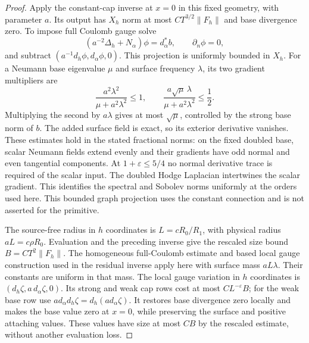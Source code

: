 \documentclass[11pt]{amsart}
\theoremstyle{definition}
\theoremstyle{remark}
\theoremstyle{plain}
\begin{document}
\begin{proof}
Apply the constant-cap inverse at $x=0$ in this
fixed geometry, with parameter $a$. Its output
has $X_h$ norm at most $CT^{3/2}\|F_h\|$ and
base divergence zero. To impose full Coulomb gauge
solve
\[
       (a^{-2}\Delta_h+N_\alpha)\phi=d_\alpha^*b,
                         \qquad \partial_n\phi=0,
\]
and subtract $(a^{-1}d_h\phi,d_\alpha\phi,0)$.
This projection is uniformly bounded in $X_h$.
For a Neumann base eigenvalue $\mu$ and surface
frequency $\lambda$, its two gradient multipliers are
\begin{equation}\label{eq:excision-constant-coulomb-multipliers}
 \frac{a^2\lambda^2}{\mu+a^2\lambda^2}\leq1,\qquad
 \frac{a\sqrt\mu\,\lambda}{\mu+a^2\lambda^2}\leq\frac12 .
\end{equation}
Multiplying the second by $a\lambda$ gives at most
$\sqrt\mu$, controlled by the strong base norm of
$b$. The added surface field is exact, so its
exterior derivative vanishes.
These estimates hold in the stated fractional norms:
on the fixed doubled base, scalar Neumann fields
extend evenly and their gradients have odd normal
and even tangential components. At
$1+\varepsilon\leq5/4$ no normal derivative trace
is required of the scalar input. The doubled
Hodge Laplacian intertwines the scalar gradient.
This identifies the spectral and Sobolev norms
uniformly at the orders used here.
This bounded graph projection uses the constant
connection and is not asserted for the primitive.

The source-free radius in $h$ coordinates is
$L=cR_0/R_1$, with physical radius $aL=c\rho R_0$.
Evaluation and the preceding inverse give the
rescaled size bound $B=CT^2\|F_h\|$.
The homogeneous full-Coulomb estimate and based
local gauge construction used in the residual
inverse apply here with surface mass $aL\lambda$.
Their constants are uniform in that mass.
The local gauge variation in $h$ coordinates is
$(d_h\zeta,a\,d_\alpha\zeta,0)$.
Its strong and weak cap rows cost at most
$CL^{-\varepsilon}B$; for the weak base row use
$a d_\alpha d_h\zeta=d_h(a d_\alpha\zeta)$.
It restores base divergence zero locally and makes
the base value zero at $x=0$, while preserving
the surface and positive attaching values.
These values have size at most $CB$ by the
rescaled estimate, without another evaluation loss.


\end{proof}
\end{document}
